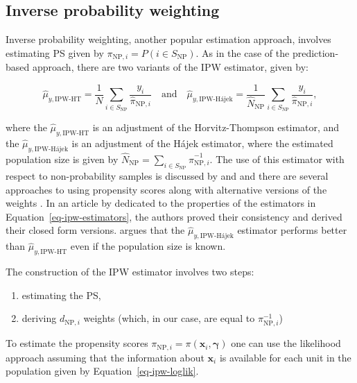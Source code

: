 \documentclass[
]{jss}
\begin{document}
\subsection{Inverse probability weighting}\label{sec-ipw}

Inverse probability weighting, another popular estimation approach,
involves estimating PS given by
\(\pi_{\text{NP},i}=P\left(i \in S_{\text{NP}} \right)\). As in the case
of the prediction-based approach, there are two variants of the IPW
estimator, given by:

\begin{equation}
  \hat{\mu}_{y,\text{IPW-HT}}=\frac{1}{N} \sum_{i \in S_{\text{NP}}} \frac{y_i}{\hat{\pi}_{\text{NP},i}} \quad \text{and} \quad 
  \hat{\mu}_{y,\text{IPW-H\'{a}jek}}=\frac{1}{\hat{N}_{\text{NP}}} \sum_{i \in S_{\text{NP}}} \frac{y_i}{\hat{\pi}_{\text{NP},i}},
\label{eq-ipw-estimators}
\end{equation}

where the \(\hat{\mu}_{y,\text{IPW-HT}}\) is an adjustment of the
Horvitz-Thompson estimator, and the
\(\hat{\mu}_{y,\text{IPW-H\'{a}jek}}\) is an adjustment of the Hájek
estimator, where the estimated population size is given by
\(\hat{N}_{\text{NP}} = \sum_{i \in S_{\text{NP}}} \hat{\pi}_{\text{NP},i}^{-1}\).
The use of this estimator with respect to non-probability samples is
discussed by \citet{lee2006propensity} and
\citet[Chapter 13]{biffignandi2021handbook} and there are several
approaches to using propensity scores along with alternative versions of
the weights \citep[cf.][Section 3]{elliott_inference_2017}. In an
article by \citet{chen2020doubly} dedicated to the properties of the
estimators in Equation~\ref{eq-ipw-estimators}, the authors proved their
consistency and derived their closed form versions.
\citet[Section 4.2]{wu2022statistical} argues that the
\(\hat{\mu}_{y,\text{IPW-H\'{a}jek}}\) estimator performs better than
\(\hat{\mu}_{y,\text{IPW-HT}}\) even if the population size is known.

The construction of the IPW estimator involves two steps:

\begin{enumerate}
\item estimating the PS, 
\item deriving $d_{\text{NP},i}$ weights (which, in our case, are equal to $\pi_{\text{NP},i}^{-1}$) 
\end{enumerate}

To estimate the propensity scores
\(\pi_{\text{NP},i}=\pi(\boldsymbol{x}_i, \boldsymbol{\gamma})\) one can
use the likelihood approach assuming that the information about
\(\boldsymbol{x}_i\) is available for each unit in the population given
by Equation~\ref{eq-ipw-loglik}.
\end{document}
